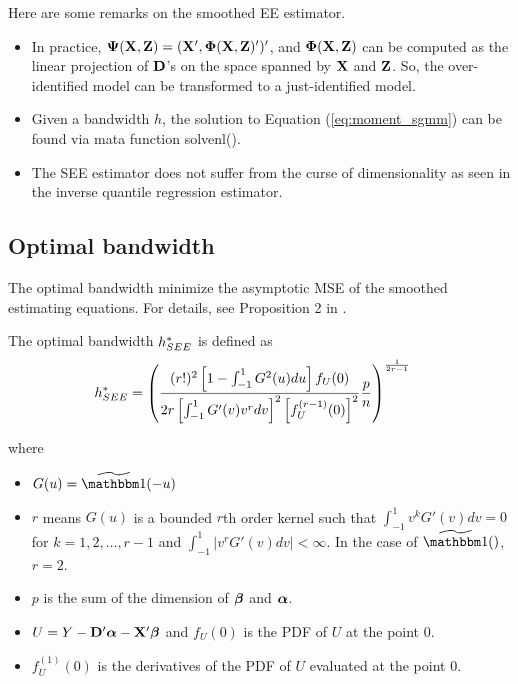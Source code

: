 Here are some remarks on the smoothed EE estimator.

\begin{itemize}
  \item In practice, $\boldsymbol{\Psi}(\mathbf{X}, \mathbf{Z}) = (\mathbf{X}', \boldsymbol{\Phi}(\mathbf{X}, \mathbf{Z})')'$, and
    $\boldsymbol{\Phi}(\mathbf{X}, \mathbf{Z})$ can be computed as the linear projection of $\mathbf{D}$'s on the
    space spanned by $\mathbf{X}$ and $\mathbf{Z}$. So, the over-identified model can 
    be transformed to a just-identified model. 

  \item Given a bandwidth $h$, the solution to Equation (\ref{eq:moment_sgmm})
    can be found via mata function {\ty solvenl()}. 

  \item The SEE estimator does not suffer from the curse of dimensionality as
    seen in the inverse quantile regression estimator.
\end{itemize}

\subsection{Optimal bandwidth}
The optimal bandwidth minimize the asymptotic MSE of the smoothed estimating
equations. For details, see Proposition 2 in \cite{Kaplan2017}.

The optimal bandwidth $h^*_{SEE}$ is defined as
\begin{align}
  h^*_{SEE} & = 
\left(
\frac{(r!)^2 \left[ 1- \int_{-1}^{1}G^2(u)du \right] f_U(0)}
{2r \left[\int_{-1}^1 G'(v)v^rdv \right]^2 
\left[f_U^{(r-1)}(0) \right]^2} \frac{p}{n}\right)^{\frac{1}{2r - 1}}
\end{align} 

where 
\begin{itemize}
  \item $G(u) = \Is(-u)$ 
  \item $r$ means $G(u)$ is a bounded $r$th order kernel such that $\int_{-1}^1
    v^k G'(v)dv = 0$ for $k = 1, 2, \ldots, r-1$ and $\int_{-1}^1 |v^r G'(v)dv|
    < \infty$. In the case of $\Is()$, $r = 2$.
  \item $p$ is the sum of the dimension of $\boldsymbol{\beta}$ and $\boldsymbol{\alpha}$.
  \item $U = Y - \mathbf{D}'\boldsymbol{\alpha} - \mathbf{X}'\boldsymbol{\beta}$ and $f_U(0)$ is the PDF of
    $U$ at the point $0$.
  \item $f^{(1)}_U(0)$ is the derivatives of the PDF of $U$ evaluated at the
    point $0$.
\end{itemize}


